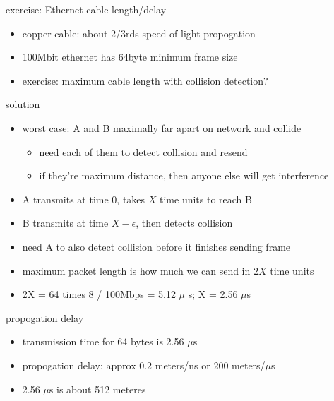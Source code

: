 \begin{frame}{exercise: Ethernet cable length/delay}
    \begin{itemize}
    \item copper cable: about 2/3rds speed of light propogation
    \item 100Mbit ethernet has 64byte minimum frame size
    \vspace{.5cm}
    \item exercise: maximum cable length with collision detection?
    \end{itemize}
\end{frame}

\begin{frame}{solution}
\begin{itemize}
\item worst case: A and B maximally far apart on network and collide
    \begin{itemize}
    \item need each of them to detect collision and resend
    \item if they're maximum distance, then anyone else will get interference
    \end{itemize}
\item A transmits at time 0, takes $X$ time units to reach B
\item B transmits at time $X-\epsilon$, then detects collision
\item need A to also detect collision before it finishes sending frame
\item maximum packet length is how much we can send in $2X$ time units
\item 2X = 64 times 8 / 100Mbps  = 5.12 $\mu$ s; X = 2.56 $\mu$s
\end{itemize}
\end{frame}

\begin{frame}{propogation delay}
\begin{itemize}
\item transmission time for 64 bytes is 2.56 $\mu$s
\item propogation delay: approx 0.2 meters/ns or 200 meters/$\mu$s
\item 2.56 $\mu$s is about 512 meteres
\end{itemize}
\end{frame}


